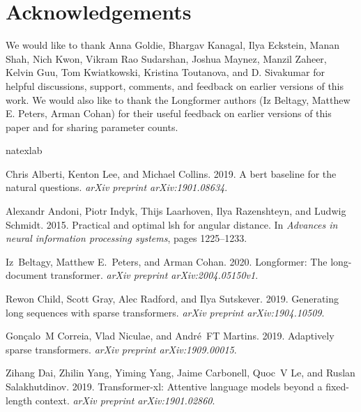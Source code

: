 \documentclass[11pt,a4paper]{article}
\begin{document}
\section*{Acknowledgements} 
We would like to thank Anna Goldie, Bhargav Kanagal, Ilya Eckstein, Manan Shah, Nich Kwon, Vikram Rao Sudarshan, Joshua Maynez, Manzil Zaheer, Kelvin Guu, Tom Kwiatkowski, Kristina Toutanova, and D. Sivakumar for helpful discussions, support, comments, and feedback on earlier versions of this work.  We would also like to thank the Longformer authors (Iz Beltagy, Matthew E. Peters, Arman Cohan) for their useful feedback on earlier versions of this paper and for sharing parameter counts.




\begin{thebibliography}{44}
\expandafter\ifx\csname natexlab\endcsname\relax\def\natexlab#1{#1}\fi

Chris Alberti, Kenton Lee, and Michael Collins. 2019.
\newblock A bert baseline for the natural questions.
\newblock \emph{arXiv preprint arXiv:1901.08634}.

Alexandr Andoni, Piotr Indyk, Thijs Laarhoven, Ilya Razenshteyn, and Ludwig
  Schmidt. 2015.
\newblock Practical and optimal lsh for angular distance.
\newblock In \emph{Advances in neural information processing systems}, pages
  1225--1233.

Iz~Beltagy, Matthew E.~Peters, and Arman Cohan. 2020.
\newblock Longformer: The long-document transformer.
\newblock \emph{arXiv preprint arXiv:2004.05150v1}.

Rewon Child, Scott Gray, Alec Radford, and Ilya Sutskever. 2019.
\newblock Generating long sequences with sparse transformers.
\newblock \emph{arXiv preprint arXiv:1904.10509}.

Gon{\c{c}}alo~M Correia, Vlad Niculae, and Andr{\'e}~FT Martins. 2019.
\newblock Adaptively sparse transformers.
\newblock \emph{arXiv preprint arXiv:1909.00015}.

Zihang Dai, Zhilin Yang, Yiming Yang, Jaime Carbonell, Quoc~V Le, and Ruslan
  Salakhutdinov. 2019.
\newblock Transformer-xl: Attentive language models beyond a fixed-length
  context.
\newblock \emph{arXiv preprint arXiv:1901.02860}.


\end{thebibliography}
\end{document}

